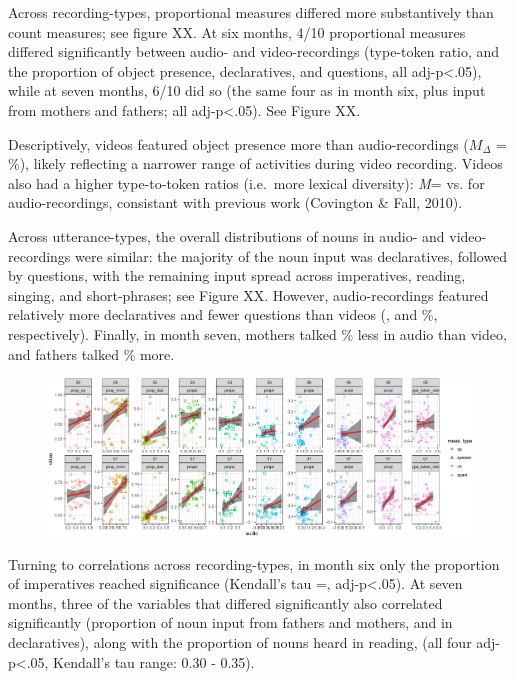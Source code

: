 \documentclass[man]{apa6}
\theoremstyle{definition}
\theoremstyle{definition}
\theoremstyle{definition}
\theoremstyle{remark}
\begin{document}
Across recording-types, proportional measures differed more
substantively than count measures; see figure XX. At six months, 4/10
proportional measures differed significantly between audio- and
video-recordings (type-token ratio, and the proportion of object
presence, declaratives, and questions, all adj-p\textless{}.05), while
at seven months, 6/10 did so (the same four as in month six, plus input
from mothers and fathers; all adj-p\textless{}.05). See Figure XX.

Descriptively, videos featured object presence more than
audio-recordings (\(M_{\Delta}\) = \%), likely reflecting a narrower
range of activities during video recording. Videos also had a higher
type-to-token ratios (i.e.~more lexical diversity): \emph{M}= vs. for
audio-recordings, consistant with previous work (Covington \& Fall,
2010).

Across utterance-types, the overall distributions of nouns in audio- and
video-recordings were similar: the majority of the noun input was
declaratives, followed by questions, with the remaining input spread
across imperatives, reading, singing, and short-phrases; see Figure XX.
However, audio-recordings featured relatively more declaratives and
fewer questions than videos (, and \%, respectively). Finally, in month
seven, mothers talked \% less in audio than video, and fathers talked \%
more.

\begin{figure}[htbp]
\centering
\includegraphics{sixseven_papaja_files/figure-latex/gr_derived_props_av-1.pdf}
\caption{}
\end{figure}

Turning to correlations across recording-types, in month six only the
proportion of imperatives reached significance (Kendall's tau =,
adj-p\textless{}.05). At seven months, three of the variables that
differed significantly also correlated significantly (proportion of noun
input from fathers and mothers, and in declaratives), along with the
proportion of nouns heard in reading, (all four adj-p\textless{}.05,
Kendall's tau range: 0.30 - 0.35).
\end{document}
